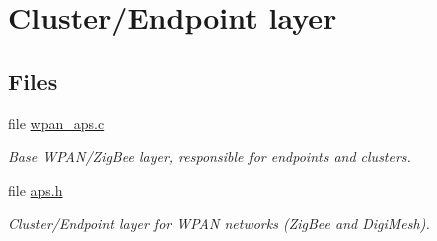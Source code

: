 \hypertarget{group__wpan__aps}{\section{Cluster/\-Endpoint layer}
\label{group__wpan__aps}
}
\subsection*{Files}
\begin{DoxyCompactItemize}
\item 
file \hyperlink{wpan__aps_8c}{wpan\-\_\-aps.\-c}
\begin{DoxyCompactList}\small\item\em Base W\-P\-A\-N/\-Zig\-Bee layer, responsible for endpoints and clusters. \end{DoxyCompactList}\item 
file \hyperlink{aps_8h}{aps.\-h}
\begin{DoxyCompactList}\small\item\em Cluster/\-Endpoint layer for W\-P\-A\-N networks (Zig\-Bee and Digi\-Mesh). \end{DoxyCompactList}\end{DoxyCompactItemize}
